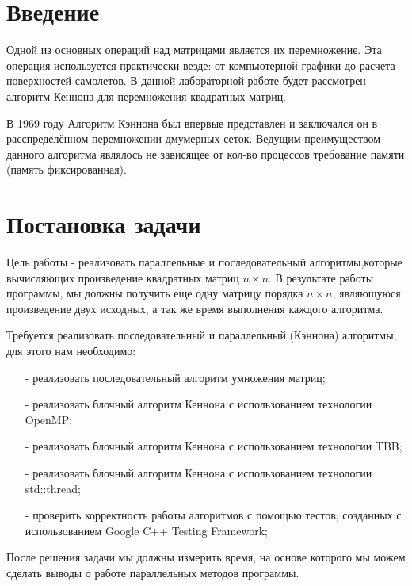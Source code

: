 \documentclass{report}
\begin{document}
\setcounter{page}{2}

\tableofcontents
\newpage

\section*{Введение}
Одной из основных операций над матрицами является их перемножение. Эта операция используется практически везде: от компьютерной графики до расчета поверхностей самолетов. В данной лабораторной работе будет рассмотрен алгоритм Кеннона для перемножения квадратных матриц.
\par В 1969 году Алгоритм Кэннона был впервые представлен и заключался он в расспределённом перемножении дмумерных сеток. Ведущим преимуществом данного алгоритма являлось не зависящее от кол-во процессов требование памяти (память фиксированная).
\newpage

\section*{Постановка задачи}
Цель работы - реализовать параллельные и последовательный алгоритмы,которые  вычисляющих произведение квадратных матриц {\itshape $n \times n$}. В результате работы программы, мы должны получить еще одну матрицу порядка {\itshape $n \times n$}, являющуюся произведение двух исходных, а так же время выполнения каждого алгоритма.

\par Требуется реализовать последовательный и параллельный (Кэннона) алгоритмы, для этого нам необходимо:

\begin{itemize}
    \item[-] реализовать последовательный алгоритм умножения матриц;
    \item[-] реализовать блочный алгоритм Кеннона с использованием технологии OpenMP;
    \item[-] реализовать блочный алгоритм Кеннона с использованием технологии TBB;
    \item[-] реализовать блочный алгоритм Кеннона с использованием технологии std::thread;
    \item[-] проверить корректность работы алгоритмов с помощью тестов, созданных с использованием Google C++ Testing Framework;
\end{itemize}
\par После решения задачи мы должны измерить время, на основе которого мы можем сделать выводы о работе параллельных методов программы.
\newpage
\end{document}
